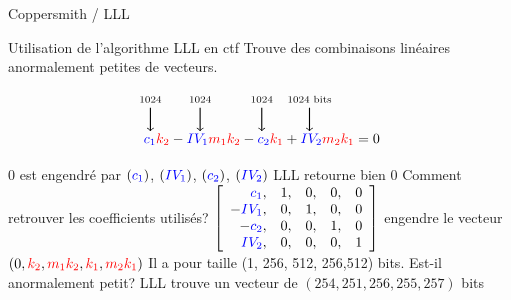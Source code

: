\begin{frame}{Coppersmith / LLL}
\begin{block}{Utilisation de l'algorithme LLL en ctf}
    Trouve des combinaisons linéaires anormalement petites de vecteurs.
\end{block}

\pause

\vspace{-0.4cm}

     \[
        \begin{tikzpicture}[baseline=(eq.base)]
            \node (eq) at (0,0) {$\k{c_1}\u{k_2} - \k{IV_1}\u{m_1}\u{k_2} - \k{c_2}\u{k_1} +  \k{IV_2}\u{m_2}\u{k_1} =  0$};

            \foreach \x/\label in {
                -2.8/1024,
                -1.55/1024,
                 0./1024,
                 1.2/1024 bits
            } {
                \draw[<-, thick] (\x,0.2) -- ++(0,0.6) node[above] {\scriptsize \label};
            }
        \end{tikzpicture}
    \]

\pause

\begin{outline}
    \1 $0$ est engendré par $(\textcolor{blue}{c_1})$, $(\textcolor{blue}{IV_1})$, $(\textcolor{blue}{c_2})$, $(\textcolor{blue}{IV_2})$ 
        \pause
        \2[$\longrightarrow$]  LLL retourne bien $0$
    \1 Comment retrouver les coefficients utilisés?
    \pause
    \1 $\left[
    \begin{array}{ r c c c c}
        \textcolor{blue}{c_1},  &1, &0, &0, &0  \\
        -\textcolor{blue}{IV_1},&0, &1, &0, &0 \\
        -\textcolor{blue}{c_2}, &0, &0, &1, &0 \\
        \textcolor{blue}{IV_2}, &0, &0, &0, &1 \\
    \end{array}
    \right]$ engendre le vecteur $(0, \textcolor{red}{k_2},\textcolor{red}{m_1}\textcolor{red}{k_2},\textcolor{red}{k_1},\textcolor{red}{m_2}\textcolor{red}{k_1})$
    \pause
    \1 Il a pour taille (1, 256, 512, 256,512) bits. Est-il anormalement petit?
    \pause 
     \2[$\longrightarrow$] LLL trouve un vecteur de $(254, 251, 256, 255, 257)$ bits
\end{outline}
\end{frame} 




